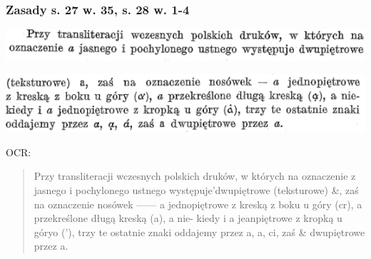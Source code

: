\documentclass[pdfpagemode=UseNone]{beamer}
\begin{document}
\begin{frame}
  \frametitle{Zasady s. 27 w. 35, s. 28 w. 1-4}
  \includegraphics[width=\hsize]{img/Zasady27-35}
  
  \includegraphics[width=\hsize]{img/Zasady28-1_4}

  OCR:
  \begin{quote}
Przy transliteracji wczesnych polskich druków, w których na
oznaczenie z jasnego i pochylonego ustnego występuje'dwupiętrowe
(teksturowe) \&, zaś na oznaczenie nosówek —— a jednopiętrowe
z kreską z boku u góry (cr), a przekreślone długą kreską (a), a nie-
kiedy i a jeanpiętrowe z kropką u góryo ('), trzy te ostatnie znaki
oddajemy przez a, a, ci, zaś \& dwupiętrowe przez a. 
\end{quote}
\end{frame}
\end{document}
